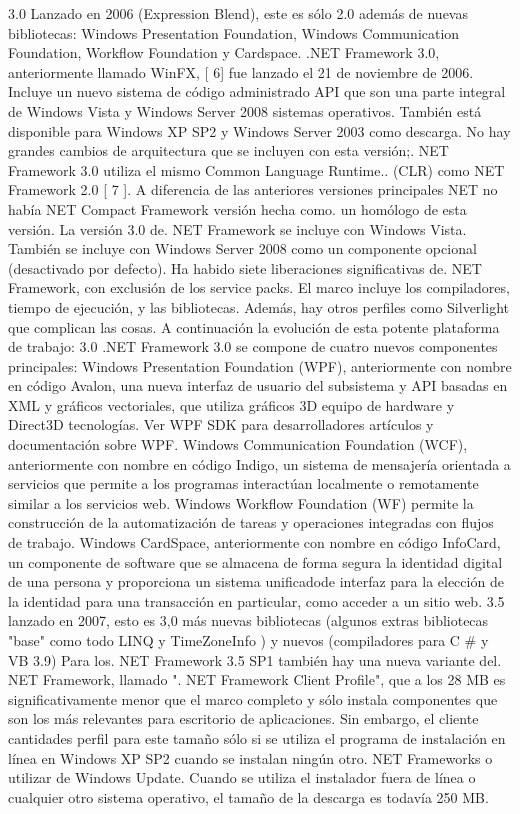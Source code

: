 3.0
Lanzado en 2006 (Expression Blend), este es sólo 2.0 además de nuevas bibliotecas: Windows Presentation Foundation, Windows Communication Foundation, Workflow Foundation y Cardspace. .NET Framework 3.0, anteriormente llamado WinFX, [ 6] fue lanzado el 21 de noviembre de 2006. Incluye un nuevo sistema de código administrado API que son una parte integral de Windows Vista y Windows Server 2008 sistemas operativos. También está disponible para Windows XP SP2 y Windows Server 2003 como descarga. No hay grandes cambios de arquitectura que se incluyen con esta versión;. NET Framework 3.0 utiliza el mismo Common Language Runtime.. (CLR) como NET Framework 2.0 [ 7 ]. A diferencia de las anteriores versiones principales NET no había NET Compact Framework versión hecha como. un homólogo de esta versión. La versión 3.0 de. NET Framework se incluye con Windows Vista. También se incluye con Windows Server 2008 como un componente opcional (desactivado por defecto).
Ha habido siete liberaciones significativas de. NET Framework, con exclusión de los service packs. El marco incluye los compiladores, tiempo de ejecución, y las bibliotecas. Además, hay otros perfiles como Silverlight que complican las cosas. A continuación la evolución de esta potente plataforma de trabajo:
3.0
.NET Framework 3.0 se compone de cuatro nuevos componentes principales:
Windows Presentation Foundation (WPF), anteriormente con nombre en código Avalon, una nueva interfaz de usuario del subsistema y API basadas en XML y gráficos vectoriales, que utiliza gráficos 3D equipo de hardware y Direct3D tecnologías. Ver WPF SDK para desarrolladores artículos y documentación sobre WPF.
Windows Communication Foundation (WCF), anteriormente con nombre en código Indigo, un sistema de mensajería orientada a servicios que permite a los programas interactúan localmente o remotamente similar a los servicios web.
Windows Workflow Foundation (WF) permite la construcción de la automatización de tareas y operaciones integradas con flujos de trabajo.
Windows CardSpace, anteriormente con nombre en código InfoCard, un componente de software que se almacena de forma segura la identidad digital de una persona y proporciona un sistema unificadode interfaz para la elección de la identidad para una transacción en particular, como acceder a un sitio web.
3.5
lanzado en 2007, esto es 3,0 más nuevas bibliotecas (algunos extras bibliotecas "base" como todo LINQ y TimeZoneInfo ) y nuevos (compiladores para C # y VB 3.9)
Para los. NET Framework 3.5 SP1 también hay una nueva variante del. NET Framework, llamado ". NET Framework Client Profile", que a los 28 MB es significativamente menor que el marco completo y sólo instala componentes que son los más relevantes para escritorio de aplicaciones. Sin embargo, el cliente cantidades perfil para este tamaño sólo si se utiliza el programa de instalación en línea en Windows XP SP2 cuando se instalan ningún otro. NET Frameworks o utilizar de Windows Update. Cuando se utiliza el instalador fuera de línea o cualquier otro sistema operativo, el tamaño de la descarga es todavía 250 MB. 
